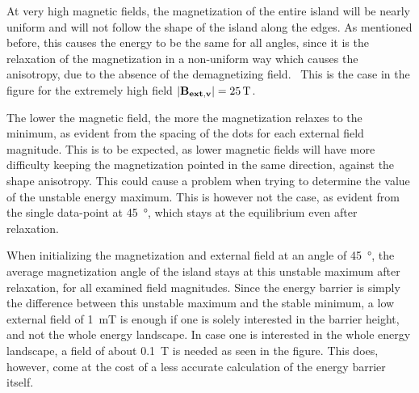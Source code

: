 \documentclass[11pt,a4paper,english]{article}
\begin{document}
At very high magnetic fields, the magnetization of the entire island will be nearly uniform and will not follow the shape of the island along the edges. As mentioned before, this causes the energy to be the same for all angles, since it is the relaxation of the magnetization in a non-uniform way which causes the anisotropy, due to the absence of the demagnetizing field.~\cite{Nonmonotonic_reversal} This is the case in the figure for the extremely high field $\abs{\vb{B_{ext,v}}}=\SI{25}{\tesla}$. \par
The lower the magnetic field, the more the magnetization relaxes to the minimum, as evident from the spacing of the dots for each external field magnitude. This is to be expected, as lower magnetic fields will have more difficulty keeping the magnetization pointed in the same direction, against the shape anisotropy. This could cause a problem when trying to determine the value of the unstable energy maximum. This is however not the case, as evident from the single data-point at \SI{45}{\degree}, which stays at the equilibrium even after relaxation. \par
When initializing the magnetization and external field at an angle of \SI{45}{\degree}, the average magnetization angle of the island stays at this unstable maximum after relaxation, for all examined field magnitudes. Since the energy barrier is simply the difference between this unstable maximum and the stable minimum, a low external field of \SI{1}{\milli\tesla} is enough if one is solely interested in the barrier height, and not the whole energy landscape. In case one is interested in the whole energy landscape, a field of about \SI{0.1}{\tesla} is needed as seen in the figure. This does, however, come at the cost of a less accurate calculation of the energy barrier itself. \par
\end{document}
